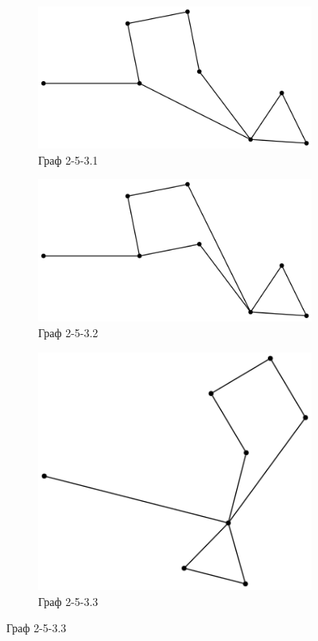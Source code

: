 \begin{solution}
\begin{figure}[H]
    \centering
    \begin{subfigure}[b]{0.45\linewidth}
        \centering
        \includegraphics[scale=0.4]{Fall/img/solution-441_253_1.dot.png}
        \caption{Граф 2-5-3.1} \label{graph 2-5-3.1}
    \end{subfigure}
    \begin{subfigure}[b]{0.45\linewidth} 
        \centering
        \includegraphics[scale=0.4]{Fall/img/solution-441_253_2.dot.png}
        \caption{Граф 2-5-3.2} \label{graph 2-5-3.2}
    \end{subfigure}
    \begin{subfigure}[b]{0.45\linewidth} 
        \centering
        \includegraphics[scale=0.4]{Fall/img/solution-441_253_3.dot.png}
        \caption{Граф 2-5-3.3} \label{graph 2-5-3.3}
    \end{subfigure}
    

\end{figure}
\end{solution}
